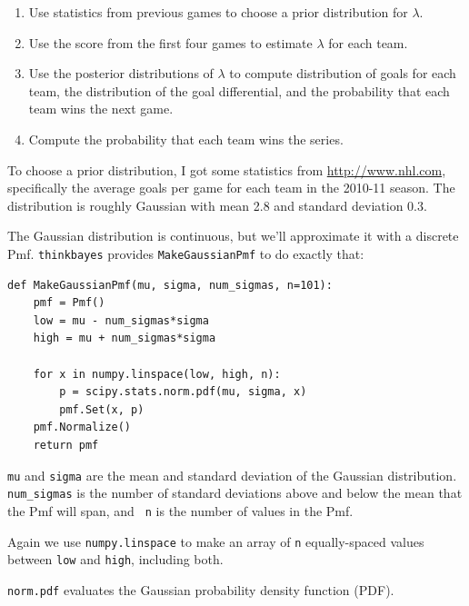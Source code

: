 \documentclass[12pt]{book}
\begin{document}
\begin{enumerate}

\item Use statistics from previous games to choose a prior
distribution for $\lambda$.

\item Use the score from the first four games to estimate $\lambda$
for each team.

\item Use the posterior distributions of $\lambda$ to compute 
distribution of goals for each team, the distribution of the
goal differential, and the probability that each team wins
the next game.

\item Compute the probability that each team wins the series.

\end{enumerate}

To choose a prior distribution, I got some statistics from
\url{http://www.nhl.com}, specifically the average goals per game
for each team in the 2010-11 season.  The distribution is roughly
Gaussian with mean 2.8 and standard deviation 0.3.

The Gaussian distribution is continuous, but we'll approximate it with
a discrete Pmf.  \verb"thinkbayes" provides \verb"MakeGaussianPmf" to
do exactly that:

\begin{verbatim}
def MakeGaussianPmf(mu, sigma, num_sigmas, n=101):
    pmf = Pmf()
    low = mu - num_sigmas*sigma
    high = mu + num_sigmas*sigma

    for x in numpy.linspace(low, high, n):
        p = scipy.stats.norm.pdf(mu, sigma, x)
        pmf.Set(x, p)
    pmf.Normalize()
    return pmf
\end{verbatim}  

{\tt mu} and {\tt sigma} are the mean and standard deviation of the
Gaussian distribution.  \verb"num_sigmas" is the number of standard
deviations above and below the mean that the Pmf will span, and {\tt
  n} is the number of values in the Pmf.

Again we use {\tt numpy.linspace} to make an array of {\tt n}
equally-spaced values between {\tt low} and {\tt high}, including
both.

\verb"norm.pdf" evaluates the Gaussian probability density function (PDF).
\end{document}
